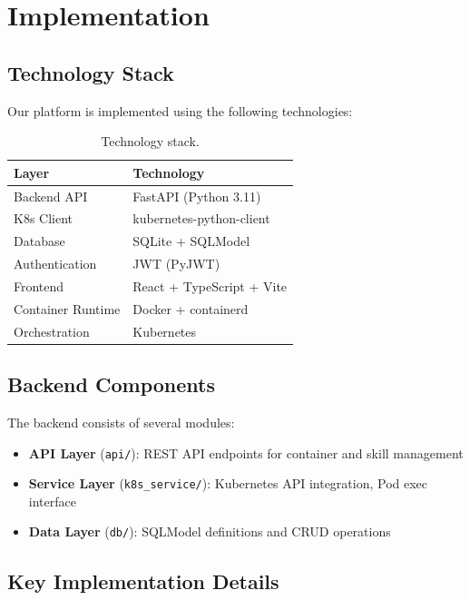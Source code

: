 \section{Implementation}
\label{sec:implementation}

\subsection{Technology Stack}

Our platform is implemented using the following technologies:

\begin{table}[htbp]
    \centering
    \caption{Technology stack.}
    \label{tab:tech_stack}
    \begin{tabular}{@{}ll@{}}
        \toprule
        \textbf{Layer} & \textbf{Technology} \\
        \midrule
        Backend API & FastAPI (Python 3.11) \\
        K8s Client & kubernetes-python-client \\
        Database & SQLite + SQLModel \\
        Authentication & JWT (PyJWT) \\
        Frontend & React + TypeScript + Vite \\
        Container Runtime & Docker + containerd \\
        Orchestration & Kubernetes \\
        \bottomrule
    \end{tabular}
\end{table}

\subsection{Backend Components}

The backend consists of several modules:

\begin{itemize}
    \item \textbf{API Layer} (\texttt{api/}): REST API endpoints for container and skill management
    \item \textbf{Service Layer} (\texttt{k8s\_service/}): Kubernetes API integration, Pod exec interface
    \item \textbf{Data Layer} (\texttt{db/}): SQLModel definitions and CRUD operations
\end{itemize}

\subsection{Key Implementation Details}

